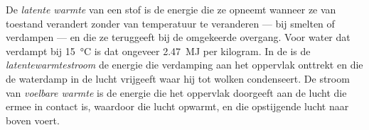 \begin{definition}\label{def:g10:earth-energy-budget:latent-heat}
De \emph{latente warmte} van een stof is de energie die
ze opneemt wanneer ze van toestand verandert zonder van temperatuur te
veranderen --- bij smelten of verdampen --- en die ze teruggeeft bij de
omgekeerde overgang. Voor water dat verdampt bij \qty{15}{\degreeCelsius} is
dat ongeveer \qty{2.47}{MJ} per kilogram. In de  is de
\emph{latentewarmtestroom} de energie die verdamping aan het oppervlak onttrekt
en die de waterdamp in de lucht vrijgeeft waar hij tot wolken condenseert. De
stroom van \emph{voelbare warmte} is de energie die het
oppervlak doorgeeft aan de lucht die ermee in contact is, waardoor die lucht
opwarmt, en die opstijgende lucht naar boven voert.
\end{definition}

